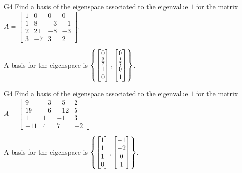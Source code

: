 \begin{problem}{G4}
Find a basis of the eigenspace associated to the eigenvalue \(1\) for the matrix 
\(A=\begin{bmatrix} 1&0&0&0\\1&8 & -3 & -1 \\ 2&21 & -8 & -3 \\ 3&-7 & 3  & 2 \end{bmatrix}\).
\end{problem}
\begin{solution}
A basis for the eigenspace is  $\left\{\begin{bmatrix} 0\\\frac{3}{7} \\ 1 \\ 0 \end{bmatrix},\begin{bmatrix}0\\\frac{1}{7} \\ 0 \\ 1 \end{bmatrix}\right\}$.
\end{solution}

\begin{problem}{G4}
Find a basis of the eigenspace associated to the eigenvalue \(1\) for the matrix 
\(A=\begin{bmatrix}9 & -3 & -5 & 2 \\ 19 & -6 & -12 & 5 \\ 1 & 1 & -1 & 3 \\ -11 & 4 & 7 & -2 \end{bmatrix}\).
\end{problem}
\begin{solution}
A basis for the eigenspace is  $\left\{\begin{bmatrix}1 \\ 1 \\ 1 \\ 0\end{bmatrix},\begin{bmatrix} -1 \\ -2 \\ 0 \\ 1 \end{bmatrix}\right\}$.
\end{solution}

